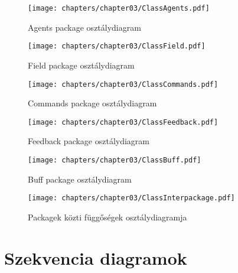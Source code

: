 \begin{figure}[h]
\begin{center}
\texttt{[image: chapters/chapter03/ClassAgents.pdf]}
\caption{Agents package osztálydiagram}
\label{Agents package osztálydiagram}
\end{center}
\end{figure}

\begin{figure}[h]
\begin{center}
\texttt{[image: chapters/chapter03/ClassField.pdf]}
\caption{Field package osztálydiagram}
\label{Field package osztálydiagram}
\end{center}
\end{figure}

\clearpage

\begin{figure}[h]
\begin{center}
\texttt{[image: chapters/chapter03/ClassCommands.pdf]}
\caption{Commands package osztálydiagram}
\label{Commands package osztálydiagram}
\end{center}
\end{figure}


\begin{figure}[h]
\begin{center}
\texttt{[image: chapters/chapter03/ClassFeedback.pdf]}
\caption{Feedback package osztálydiagram}
\label{Feedback package osztálydiagram}
\end{center}
\end{figure}


\begin{figure}[h]
\begin{center}
\texttt{[image: chapters/chapter03/ClassBuff.pdf]}
\caption{Buff package osztálydiagram}
\label{Buff package osztálydiagram}
\end{center}
\end{figure}


\begin{figure}[h]
\begin{center}
\texttt{[image: chapters/chapter03/ClassInterpackage.pdf]}
\caption{Packagek közti függőségek osztálydiagramja}
\label{Packagek közti függőségek osztálydiagramja}
\end{center}
\end{figure}

\clearpage

\section{Szekvencia diagramok}

